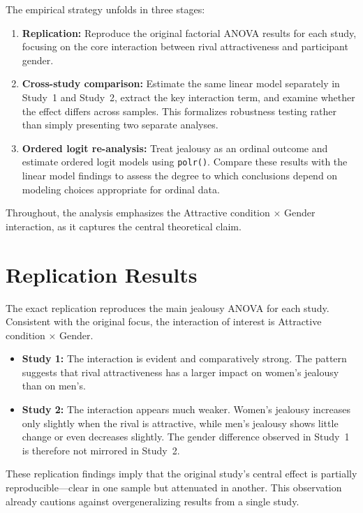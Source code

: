 \documentclass[12pt]{article}
\begin{document}
The empirical strategy unfolds in three stages:

\begin{enumerate}
	\item \textbf{Replication:} Reproduce the original factorial ANOVA results for each study, focusing on the core interaction between rival attractiveness and participant gender.
	
	\item \textbf{Cross-study comparison:} Estimate the same linear model separately in Study~1 and Study~2, extract the key interaction term, and examine whether the effect differs across samples. This formalizes robustness testing rather than simply presenting two separate analyses.
	
	\item \textbf{Ordered logit re-analysis:} Treat jealousy as an ordinal outcome and estimate ordered logit models using \texttt{polr()}. Compare these results with the linear model findings to assess the degree to which conclusions depend on modeling choices appropriate for ordinal data.
\end{enumerate}

Throughout, the analysis emphasizes the Attractive condition $\times$ Gender interaction, as it captures the central theoretical claim.
	
\section{Replication Results}

The exact replication reproduces the main jealousy ANOVA for each study. Consistent with the original focus, the interaction of interest is Attractive condition $\times$ Gender.

\begin{itemize}
	\item \textbf{Study 1:} The interaction is evident and comparatively strong. The pattern suggests that rival attractiveness has a larger impact on women’s jealousy than on men’s.
	
	\item \textbf{Study 2:} The interaction appears much weaker. Women’s jealousy increases only slightly when the rival is attractive, while men’s jealousy shows little change or even decreases slightly. The gender difference observed in Study~1 is therefore not mirrored in Study~2.
\end{itemize}

These replication findings imply that the original study’s central effect is partially reproducible—clear in one sample but attenuated in another. This observation already cautions against overgeneralizing results from a single study.
	
\end{document}
